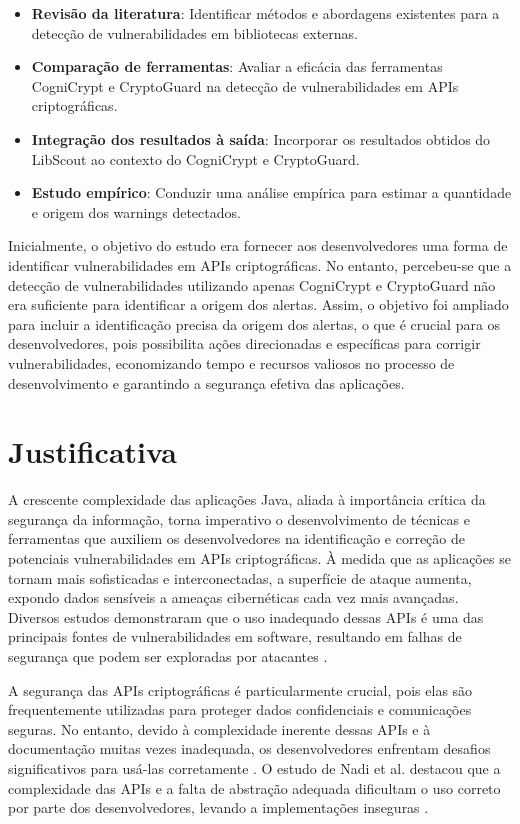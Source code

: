 \begin{itemize}
    \item \textbf{Revisão da literatura}: Identificar métodos e abordagens existentes para a detecção de vulnerabilidades em bibliotecas externas.
    \item \textbf{Comparação de ferramentas}: Avaliar a eficácia das ferramentas CogniCrypt e CryptoGuard na detecção de vulnerabilidades em APIs criptográficas.
    \item \textbf{Integração dos resultados à saída}: Incorporar os resultados obtidos do LibScout ao contexto do CogniCrypt e CryptoGuard.
    \item \textbf{Estudo empírico}: Conduzir uma análise empírica para estimar a quantidade e origem dos warnings detectados.
\end{itemize}

Inicialmente, o objetivo do estudo era fornecer aos desenvolvedores uma forma de identificar vulnerabilidades em APIs criptográficas. No entanto, percebeu-se que a detecção de vulnerabilidades utilizando apenas CogniCrypt e CryptoGuard não era suficiente para identificar a origem dos alertas. Assim, o objetivo foi ampliado para incluir a identificação precisa da origem dos alertas, o que é crucial para os desenvolvedores, pois possibilita ações direcionadas e específicas para corrigir vulnerabilidades, economizando tempo e recursos valiosos no processo de desenvolvimento e garantindo a segurança efetiva das aplicações.

\section{Justificativa}

A crescente complexidade das aplicações Java, aliada à importância crítica da segurança da informação, torna imperativo o desenvolvimento de técnicas e ferramentas que auxiliem os desenvolvedores na identificação e correção de potenciais vulnerabilidades em APIs criptográficas. À medida que as aplicações se tornam mais sofisticadas e interconectadas, a superfície de ataque aumenta, expondo dados sensíveis a ameaças cibernéticas cada vez mais avançadas. Diversos estudos demonstraram que o uso inadequado dessas APIs é uma das principais fontes de vulnerabilidades em software, resultando em falhas de segurança que podem ser exploradas por atacantes \cite{api_misuses_zhang, nadi_icse_2016}.

A segurança das APIs criptográficas é particularmente crucial, pois elas são frequentemente utilizadas para proteger dados confidenciais e comunicações seguras. No entanto, devido à complexidade inerente dessas APIs e à documentação muitas vezes inadequada, os desenvolvedores enfrentam desafios significativos para usá-las corretamente \cite{nadi_icse_2016}. O estudo de Nadi et al. destacou que a complexidade das APIs e a falta de abstração adequada dificultam o uso correto por parte dos desenvolvedores, levando a implementações inseguras \cite{nadi_icse_2016}.

